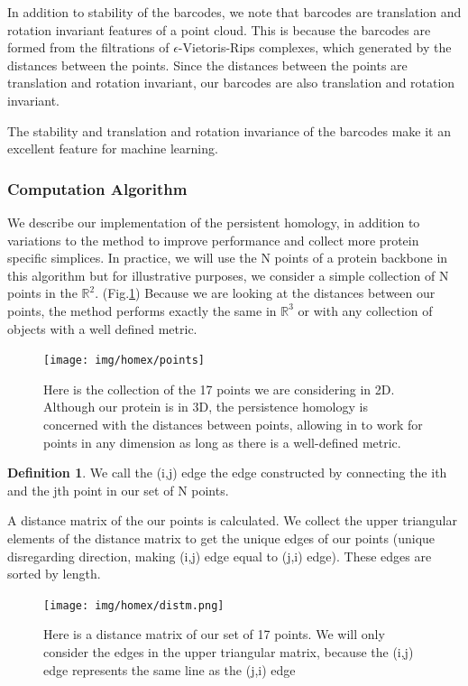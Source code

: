 \documentclass[12pt, a4paper, twocolumn, fullpage]{article}
\theoremstyle{plain}
\theoremstyle{definition}
\newtheorem{defn}{Definition}[section]
\theoremstyle{remark}
\begin{document}
In addition to stability of the barcodes, we note that barcodes are translation and rotation invariant features of a point cloud. This is because the barcodes are formed from the filtrations of $\epsilon$-Vietoris-Rips complexes, which generated by the distances between the points. Since the distances between the points are translation and rotation invariant, our barcodes are also translation and rotation invariant.

The stability and translation and rotation invariance of the barcodes make it an excellent feature for machine learning.

\subsubsection{Computation Algorithm}
We describe our implementation of the persistent homology, in addition to variations to the method to improve performance and collect more protein specific simplices. 
In practice, we will use the N points of a protein backbone in this algorithm but for illustrative purposes, we consider a simple collection of N points in the $\mathbb{R}^2$. (Fig.\ref{Collection of points}) Because we are looking at the distances between our points, the method performs exactly the same in $\mathbb{R}^3$ or with any collection of objects with a well defined metric.

\begin{figure}
    \texttt{[image: img/homex/points]}
    \caption{Here is the collection of the 17 points we are considering in 2D. Although our protein is in 3D, the persistence homology is concerned with the distances between points, allowing in to work for points in any dimension as long as there is a well-defined metric.}
    \label{Collection of points}
\end{figure}

\begin{defn}
We call the (i,j) edge the edge constructed by connecting the ith and the jth point in our set of N points.
\end{defn}

A distance matrix of the our points is calculated. We collect the upper triangular elements of the distance matrix to get the unique edges of our points (unique disregarding direction, making (i,j) edge equal to (j,i) edge). These edges are sorted by length.

\begin{figure}
    \texttt{[image: img/homex/distm.png]}
    \caption{Here is a distance matrix of our set of 17 points. We will only consider the edges in the upper triangular matrix, because the (i,j) edge represents the same line as the (j,i) edge}
    \label{Distance matrix of example}
\end{figure}
\end{document}

